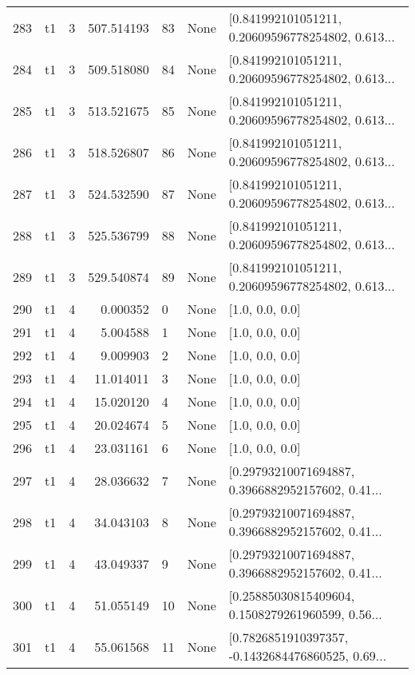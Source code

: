 \begin{tabular}{lllrlll}
283 &  t1 &   3 &  507.514193 &   83 &  None &  [0.841992101051211, 0.20609596778254802, 0.613... \\
284 &  t1 &   3 &  509.518080 &   84 &  None &  [0.841992101051211, 0.20609596778254802, 0.613... \\
285 &  t1 &   3 &  513.521675 &   85 &  None &  [0.841992101051211, 0.20609596778254802, 0.613... \\
286 &  t1 &   3 &  518.526807 &   86 &  None &  [0.841992101051211, 0.20609596778254802, 0.613... \\
287 &  t1 &   3 &  524.532590 &   87 &  None &  [0.841992101051211, 0.20609596778254802, 0.613... \\
288 &  t1 &   3 &  525.536799 &   88 &  None &  [0.841992101051211, 0.20609596778254802, 0.613... \\
289 &  t1 &   3 &  529.540874 &   89 &  None &  [0.841992101051211, 0.20609596778254802, 0.613... \\
290 &  t1 &   4 &    0.000352 &    0 &  None &                                    [1.0, 0.0, 0.0] \\
291 &  t1 &   4 &    5.004588 &    1 &  None &                                    [1.0, 0.0, 0.0] \\
292 &  t1 &   4 &    9.009903 &    2 &  None &                                    [1.0, 0.0, 0.0] \\
293 &  t1 &   4 &   11.014011 &    3 &  None &                                    [1.0, 0.0, 0.0] \\
294 &  t1 &   4 &   15.020120 &    4 &  None &                                    [1.0, 0.0, 0.0] \\
295 &  t1 &   4 &   20.024674 &    5 &  None &                                    [1.0, 0.0, 0.0] \\
296 &  t1 &   4 &   23.031161 &    6 &  None &                                    [1.0, 0.0, 0.0] \\
297 &  t1 &   4 &   28.036632 &    7 &  None &  [0.29793210071694887, 0.3966882952157602, 0.41... \\
298 &  t1 &   4 &   34.043103 &    8 &  None &  [0.29793210071694887, 0.3966882952157602, 0.41... \\
299 &  t1 &   4 &   43.049337 &    9 &  None &  [0.29793210071694887, 0.3966882952157602, 0.41... \\
300 &  t1 &   4 &   51.055149 &   10 &  None &  [0.25885030815409604, 0.1508279261960599, 0.56... \\
301 &  t1 &   4 &   55.061568 &   11 &  None &  [0.7826851910397357, -0.1432684476860525, 0.69... \\

\end{tabular}
